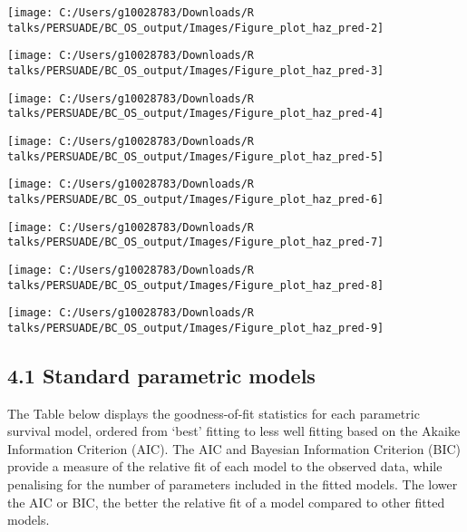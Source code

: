 \documentclass[
]{article}
\begin{document}
\begin{flushleft}\texttt{[image: C:/Users/g10028783/Downloads/R talks/PERSUADE/BC\_OS\_output/Images/Figure\_plot\_haz\_pred-2]} \end{flushleft}

\begin{flushleft}\texttt{[image: C:/Users/g10028783/Downloads/R talks/PERSUADE/BC\_OS\_output/Images/Figure\_plot\_haz\_pred-3]} \end{flushleft}

\begin{flushleft}\texttt{[image: C:/Users/g10028783/Downloads/R talks/PERSUADE/BC\_OS\_output/Images/Figure\_plot\_haz\_pred-4]} \end{flushleft}

\begin{flushleft}\texttt{[image: C:/Users/g10028783/Downloads/R talks/PERSUADE/BC\_OS\_output/Images/Figure\_plot\_haz\_pred-5]} \end{flushleft}

\begin{flushleft}\texttt{[image: C:/Users/g10028783/Downloads/R talks/PERSUADE/BC\_OS\_output/Images/Figure\_plot\_haz\_pred-6]} \end{flushleft}

\begin{flushleft}\texttt{[image: C:/Users/g10028783/Downloads/R talks/PERSUADE/BC\_OS\_output/Images/Figure\_plot\_haz\_pred-7]} \end{flushleft}

\begin{flushleft}\texttt{[image: C:/Users/g10028783/Downloads/R talks/PERSUADE/BC\_OS\_output/Images/Figure\_plot\_haz\_pred-8]} \end{flushleft}

\begin{flushleft}\texttt{[image: C:/Users/g10028783/Downloads/R talks/PERSUADE/BC\_OS\_output/Images/Figure\_plot\_haz\_pred-9]} \end{flushleft}

\subsection{4.1 Standard parametric
models}\label{standard-parametric-models}

The Table below displays the goodness-of-fit statistics for each
parametric survival model, ordered from `best' fitting to less well
fitting based on the Akaike Information Criterion (AIC). The AIC and
Bayesian Information Criterion (BIC) provide a measure of the relative
fit of each model to the observed data, while penalising for the number
of parameters included in the fitted models. The lower the AIC or BIC,
the better the relative fit of a model compared to other fitted models.
\end{document}
